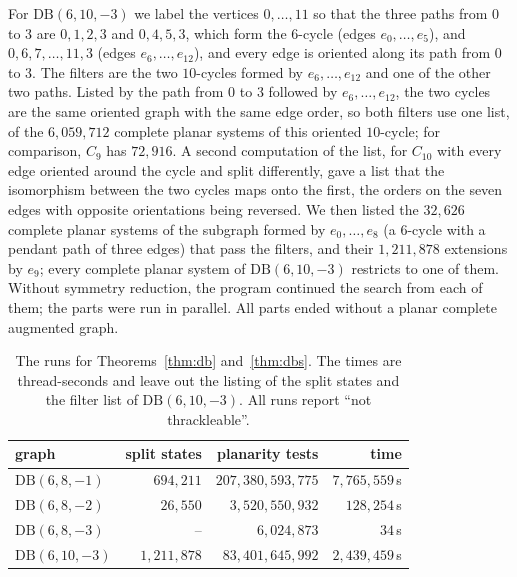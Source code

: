 \documentclass[11pt]{amsart}
\theoremstyle{definition}
\theoremstyle{remark}
\numberwithin{equation}{section}
\newcommand{\DB}{\mathrm{DB}}
\newcommand{\NSTATES}{694{,}211}
\newcommand{\NTESTS}{207{,}380{,}593{,}775}
\newcommand{\WALLSUM}{7{,}765{,}559}
\newcommand{\NSTATESB}{26{,}550}
\newcommand{\NTESTSB}{3{,}520{,}550{,}932}
\newcommand{\WALLSUMB}{128{,}254}
\newcommand{\NTESTSC}{6{,}024{,}873}
\newcommand{\NSTATESD}{1{,}211{,}878}
\newcommand{\NSTATESDNINE}{32{,}626}
\newcommand{\NTESTSD}{83{,}401{,}645{,}992}
\newcommand{\WALLSUMD}{2{,}439{,}459}
\newcommand{\NCTEN}{6{,}059{,}712}
\newcommand{\NCNINE}{72{,}916}
\begin{document}
For $\DB(6,10,-3)$ we label the vertices $0,\dots,11$ so that the three paths from $0$ to $3$ are $0,1,2,3$ and $0,4,5,3$, which form the $6$-cycle (edges $e_0,\dots,e_5$), and $0,6,7,\dots,11,3$ (edges $e_6,\dots,e_{12}$), and every edge is oriented along its path from $0$ to $3$. The filters are the two $10$-cycles formed by $e_6,\dots,e_{12}$ and one of the other two paths. Listed by the path from $0$ to $3$ followed by $e_6,\dots,e_{12}$, the two cycles are the same oriented graph with the same edge order, so both filters use one list, of the $\NCTEN$ complete planar systems of this oriented $10$-cycle; for comparison, $C_9$ has $\NCNINE$. A second computation of the list, for $C_{10}$ with every edge oriented around the cycle and split differently, gave a list that the isomorphism between the two cycles maps onto the first, the orders on the seven edges with opposite orientations being reversed. We then listed the $\NSTATESDNINE$ complete planar systems of the subgraph formed by $e_0,\dots,e_8$ (a $6$-cycle with a pendant path of three edges) that pass the filters, and their $\NSTATESD$ extensions by $e_9$; every complete planar system of $\DB(6,10,-3)$ restricts to one of them. Without symmetry reduction, the program continued the search from each of them; the parts were run in parallel. All parts ended without a planar complete augmented graph.

\begin{table}[ht]
\centering
\begin{tabular}{lrrr}
\toprule
graph & split states & planarity tests & time\\
\midrule
$\DB(6,8,-1)$ & $\NSTATES$ & $\NTESTS$ & $\WALLSUM$\,s\\
$\DB(6,8,-2)$ & $\NSTATESB$ & $\NTESTSB$ & $\WALLSUMB$\,s\\
$\DB(6,8,-3)$ & -- & $\NTESTSC$ & $34$\,s\\
$\DB(6,10,-3)$ & $\NSTATESD$ & $\NTESTSD$ & $\WALLSUMD$\,s\\
\bottomrule
\end{tabular}
\caption{The runs for Theorems~\ref{thm:db} and~\ref{thm:dbs}. The times are thread-seconds and leave out the listing of the split states and the filter list of $\DB(6,10,-3)$. All runs report ``not thrackleable''.}\label{tab:runs}
\end{table}
\end{document}
